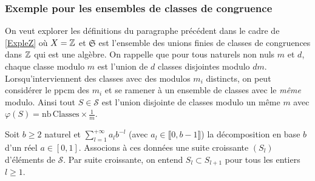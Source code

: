 \subsubsection{Exemple pour les ensembles de classes de congruence}
On veut explorer les définitions du paragraphe précédent dans le cadre de \ref{ExpleZ} où $X= \mathbb{Z}$ et $\mathfrak{S}$ est l'ensemble des unions finies de classes de congruences dans $\mathbb{Z}$ qui est une algèbre.\newline
On rappelle que pour tous naturels non nuls $m$ et $d$, chaque classe modulo $m$ est l'union de $d$ classes disjointes modulo $dm$. Lorsqu'interviennent des classes avec des modulos $m_i$ distincts, on peut considérer le ppcm des $m_i$ et se ramener à un ensemble de classes avec le \emph{même} modulo. Ainsi tout $S\in \mathcal{S}$ est l'union disjointe de classes modulo un même $m$ avec $\varphi(S) = \mathrm{nb\, Classes}\times \frac{1}{m}$.

Soit $b \geq 2$ naturel et $\sum_{l=1}^{+\infty}a_l b^{-l}$ (avec $a_l \in \llbracket 0, b-1 \rrbracket$) la décomposition en base $b$ d'un réel $a\in [0,1]$. Associons à ces données une suite croissante $(S_l)$ d'éléments de $\mathcal{S}$. Par suite croissante, on entend $S_l \subset S_{l+1}$ pour tous les entiers $l\geq1$.

